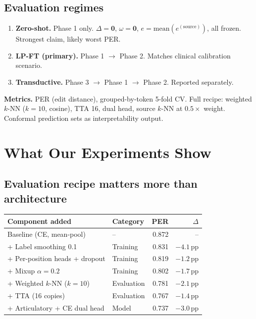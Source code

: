 \documentclass[11pt,letterpaper]{article}
\newcommand{\pp}{\,\text{pp}}
\begin{document}
\subsection{Evaluation regimes}

\begin{enumerate}[leftmargin=2em]
\item \textbf{Zero-shot.} Phase 1 only. $\Delta = \mathbf{0}$, $\omega = \mathbf{0}$, $e = \text{mean}(e^{(\text{source})})$, all frozen. Strongest claim, likely worst PER.
\item \textbf{LP-FT (primary).} Phase 1 $\to$ Phase 2. Matches clinical calibration scenario.
\item \textbf{Transductive.} Phase 3 $\to$ Phase 1 $\to$ Phase 2. Reported separately.
\end{enumerate}

\textbf{Metrics.} PER (edit distance), grouped-by-token 5-fold CV. Full recipe: weighted $k$-NN ($k{=}10$, cosine), TTA 16, dual head, source $k$-NN at $0.5\times$ weight. Conformal prediction sets as interpretability output.



\section{What Our Experiments Show}\label{sec:experiments}

\subsection{Evaluation recipe matters more than architecture}

\begin{table}[ht!]
\centering\small
\begin{tabular}{@{}llrr@{}}
\toprule
\textbf{Component added} & \textbf{Category} & \textbf{PER} & \textbf{$\Delta$} \\
\midrule
Baseline (CE, mean-pool) & -- & 0.872 & -- \\
+ Label smoothing 0.1 & Training & 0.831 & $-4.1\pp$ \\
+ Per-position heads + dropout & Training & 0.819 & $-1.2\pp$ \\
+ Mixup $\alpha{=}0.2$ & Training & 0.802 & $-1.7\pp$ \\
+ Weighted $k$-NN ($k{=}10$) & Evaluation & 0.781 & $-2.1\pp$ \\
+ TTA (16 copies) & Evaluation & 0.767 & $-1.4\pp$ \\
+ Articulatory + CE dual head & Model & 0.737 & $-3.0\pp$ \\
\bottomrule
\end{tabular}
\end{table}
\end{document}
